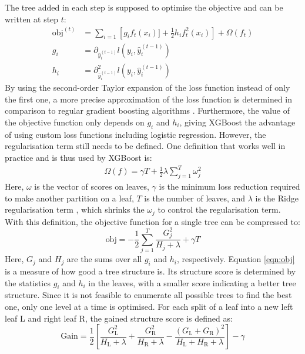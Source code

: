 The tree added in each step is supposed to optimise the objective and can be written at step $t$:
\begin{align}
  \text{obj}^{(t)} &= \sum_{i=1} \left[g_i f_t(x_i)] + \frac{1}{2}h_i f_t^2(x_i)\right] + \Omega(f_t)  \\
  g_i &= \partial_{\hat{y}_i^{(t-1)}} l(y_i, \hat{y}_i^{(t-1)}) \\
  h_i &= \partial^2_{\hat{y}_i^{(t-1)}} l(y_i, \hat{y}_i^{(t-1)})
\end{align}
By using the second-order Taylor expansion of the loss function instead of only the first one, a more precise approximation of the loss function is determined in comparison
to regular gradient boosting algorithms \cite{newton_boosting}.
Furthermore, the value of the objective function only depends on $g_i$ and $h_i$, giving XGBoost the advantage of using custom loss functions including logistic regression.
However, the regularisation term still needs to be defined. One definition that works well in practice and is thus used by XGBoost is:
\begin{align}
  \Omega (f) = \gamma T + \frac{1}{2}\lambda \sum_{j=1}^T \omega_j^2
\end{align}
Here, $\omega$ is the vector of scores on leaves, $\gamma$ is the minimum loss reduction required to make
another partition on a leaf, $T$ is the number of leaves, and $\lambda$ is the Ridge regularisation term \cite{ridge}, which shrinks the $\omega_j$ to control the
regularisation term. \\
With this definition, the objective function for a single tree can be compressed to:
\begin{equation} \label{eqn:obj}
  \text{obj} = -\frac{1}{2}\sum_{j=1}^T \frac{G_j^2}{H_j + \lambda} + \gamma T
\end{equation}
Here, $G_j$ and $H_j$ are the sums over all $g_i$ and $h_i$, respectively. Equation \ref{eqn:obj} is a measure of how good a tree structure is. Its structure score
is determined by the statistics $g_i$ and $h_i$ in the leaves, with a smaller score indicating a better tree structure.
Since it is not feasible to enumerate all possible trees to find the best one, only one level at a time is optimised.
For each split of a leaf into a new left leaf L and right leaf R, the gained structure score is defined as:
\begin{equation}
  \text{Gain} = \frac{1}{2}\left[\frac{G_{\text{L}}^2}{H_{\text{L}} + \lambda} + \frac{G_{\text{R}}^2}{H_{\text{R}} + \lambda} - \frac{(G_{\text{L}} + G_{\text{R}})^2}{H_{\text{L}}+H_{\text{R}}+\lambda}\right] -\gamma
\end{equation}

